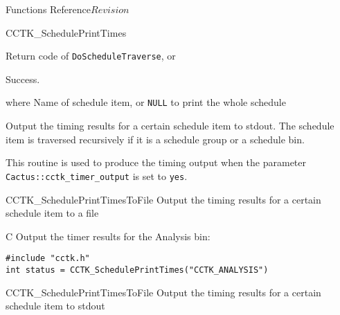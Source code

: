 \begin{cactuspart}{ Functions Reference}{}{$Revision$}
\begin{FunctionDescription}{CCTK\_SchedulePrintTimes}
  \begin{ResultSection}
    \begin{ResultNote}
      Return code of \texttt{DoScheduleTraverse}, or
    \end{ResultNote}
    \begin{Result}{0}
      Success.
    \end{Result}
  \end{ResultSection}
  
  \begin{ParameterSection}
    \begin{Parameter}{where}
      Name of schedule item, or \texttt{NULL} to print the whole
      schedule
    \end{Parameter}
  \end{ParameterSection}
  
  \begin{Discussion}
    Output the timing results for a certain schedule item to stdout.
    The schedule item is traversed recursively if it is a schedule
    group or a schedule bin.
    
    This routine is used to produce the timing output when the
    parameter \texttt{Cactus::cctk\_timer\_output} is set to
    \texttt{yes}.
  \end{Discussion}
  
  \begin{SeeAlsoSection}
    \begin{SeeAlso}{CCTK\_SchedulePrintTimesToFile}
      Output the timing results for a certain schedule item to a file
    \end{SeeAlso}
  \end{SeeAlsoSection}
  
  \begin{ExampleSection}
    \begin{Example}{C}
      Output the timer results for the Analysis bin:
\begin{verbatim}
#include "cctk.h"
int status = CCTK_SchedulePrintTimes("CCTK_ANALYSIS")
\end{verbatim}
\end{Example}
  \end{ExampleSection}
  
\end{FunctionDescription}



\begin{FunctionDescription}{CCTK\_SchedulePrintTimesToFile}
  \label{CCTK-SchedulePrintTimesToFile}
  Output the timing results for a certain schedule item to stdout
  

\end{FunctionDescription}
\end{cactuspart}
